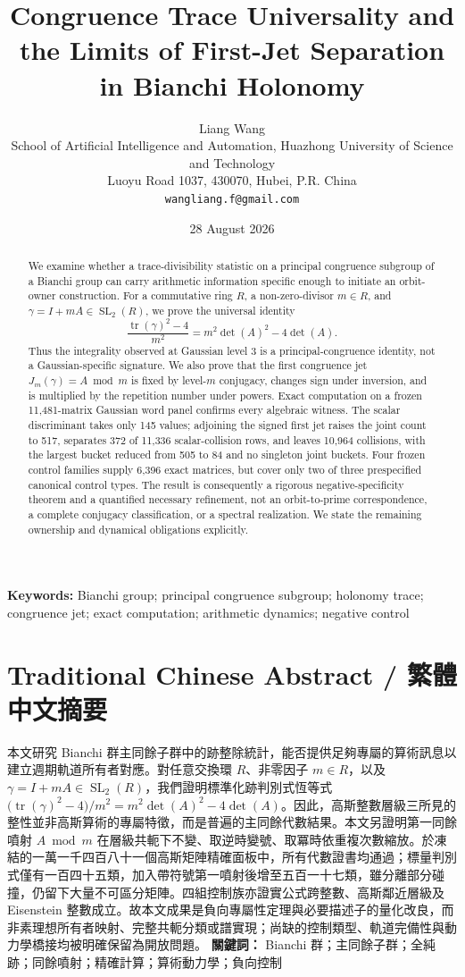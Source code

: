 \documentclass[11pt,a4paper]{article}
\title{Congruence Trace Universality and the Limits of First-Jet Separation in Bianchi Holonomy}
\author{Liang Wang\\
\small School of Artificial Intelligence and Automation, Huazhong University of Science and Technology\\
\small Luoyu Road 1037, 430070, Hubei, P.R. China\\
\small \texttt{wangliang.f@gmail.com}}
\date{28 August 2026}
\theoremstyle{definition}
\theoremstyle{remark}
\newcommand{\SL}{\operatorname{SL}}
\newcommand{\tr}{\operatorname{tr}}
\begin{document}
\maketitle

\begin{abstract}
We examine whether a trace-divisibility statistic on a principal congruence subgroup of a Bianchi group can carry arithmetic information specific enough to initiate an orbit-owner construction. For a commutative ring \(R\), a non-zero-divisor \(m\in R\), and \(\gamma=I+mA\in\SL_2(R)\), we prove the universal identity
\[
  \frac{\tr(\gamma)^2-4}{m^2}=m^2\det(A)^2-4\det(A).
\]
Thus the integrality observed at Gaussian level \(3\) is a principal-congruence identity, not a Gaussian-specific signature. We also prove that the first congruence jet \(J_m(\gamma)=A\bmod m\) is fixed by level-\(m\) conjugacy, changes sign under inversion, and is multiplied by the repetition number under powers. Exact computation on a frozen 11,481-matrix Gaussian word panel confirms every algebraic witness. The scalar discriminant takes only 145 values; adjoining the signed first jet raises the joint count to 517, separates 372 of 11,336 scalar-collision rows, and leaves 10,964 collisions, with the largest bucket reduced from 505 to 84 and no singleton joint buckets. Four frozen control families supply 6,396 exact matrices, but cover only two of three prespecified canonical control types. The result is consequently a rigorous negative-specificity theorem and a quantified necessary refinement, not an orbit-to-prime correspondence, a complete conjugacy classification, or a spectral realization. We state the remaining ownership and dynamical obligations explicitly.
\end{abstract}

\noindent\textbf{Keywords:} Bianchi group; principal congruence subgroup; holonomy trace; congruence jet; exact computation; arithmetic dynamics; negative control

\begin{otherlanguage}{chinese-traditional}
\section*{Traditional Chinese Abstract / 繁體中文摘要}
本文研究 Bianchi 群主同餘子群中的跡整除統計，能否提供足夠專屬的算術訊息以建立週期軌道所有者對應。對任意交換環 \(R\)、非零因子 \(m\in R\)，以及 \(\gamma=I+mA\in\SL_2(R)\)，我們證明標準化跡判別式恆等式 \(\bigl(\tr(\gamma)^2-4\bigr)/m^2=m^2\det(A)^2-4\det(A)\)。因此，高斯整數層級三所見的整性並非高斯算術的專屬特徵，而是普遍的主同餘代數結果。本文另證明第一同餘噴射 \(A\bmod m\) 在層級共軛下不變、取逆時變號、取冪時依重複次數縮放。於凍結的一萬一千四百八十一個高斯矩陣精確面板中，所有代數證書均通過；標量判別式僅有一百四十五類，加入帶符號第一噴射後增至五百一十七類，雖分離部分碰撞，仍留下大量不可區分矩陣。四組控制族亦證實公式跨整數、高斯鄰近層級及 Eisenstein 整數成立。故本文成果是負向專屬性定理與必要描述子的量化改良，而非素理想所有者映射、完整共軛分類或譜實現；尚缺的控制類型、軌道完備性與動力學橋接均被明確保留為開放問題。
\noindent\textbf{關鍵詞：} Bianchi 群；主同餘子群；全純跡；同餘噴射；精確計算；算術動力學；負向控制
\end{otherlanguage}
\end{document}
